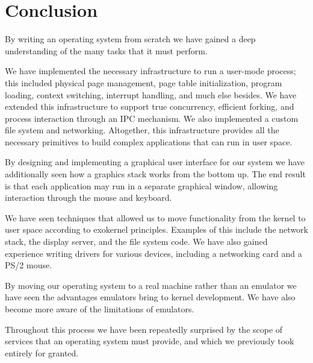 \documentclass{report}
\begin{document}

% 

\chapter{Conclusion}
By writing an operating system from scratch we have gained a deep
understanding of the many tasks that it must perform. 


We have implemented the necessary infrastructure to run a user-mode process;
this included physical page management, page table initialization, program
loading, context switching, interrupt handling, and much else besides. We have
extended this infrastructure to support true concurrency, efficient forking,
and process interaction through an IPC mechanism. We also implemented a custom
file system and networking. Altogether, this infrastructure provides all the
necessary primitives to build complex applications that can run in user space.

By designing and implementing a graphical user interface for our system we
have additionally seen how a graphics stack works from the bottom up. The end
result is that each application may run in a separate graphical window,
allowing interaction through the mouse and keyboard.

We have seen techniques that allowed us to move functionality from the kernel
to user space according to exokernel principles. Examples of this include the
network stack, the display server, and the file system code. We have also
gained experience writing drivers for various devices, including a networking
card and a PS/2 mouse.

By moving our operating system to a real machine rather than an emulator we
have seen the advantages emulators bring to kernel development. We have also
become more aware of the limitations of emulators.

Throughout this process we have been repeatedly surprised by the scope of
services that an operating system must provide, and which we previously took
entirely for granted.




\end{document}
